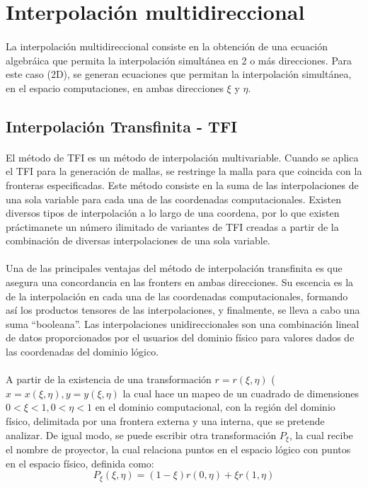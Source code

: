 \documentclass[letterpaper, openright, 12pt]{book}
\begin{document}
	\section{Interpolación multidireccional}
		\paragraph*{}
			La interpolación multidireccional consiste en la obtención de una ecuación algebráica que permita la interpolación simultánea en 2 o más direcciones. Para este caso (2D), se generan ecuaciones que permitan la interpolación simultánea, en el espacio computaciones, en ambas direcciones $\xi$ y $\eta$.
		\subsection{Interpolación Transfinita - TFI}
			\paragraph*{}
				El método de TFI es un método de interpolación multivariable. Cuando se aplica el TFI para la generación de mallas, se restringe la malla para que coincida con la fronteras especificadas. Este método consiste en la suma de las interpolaciones de una sola variable para cada una de las coordenadas computacionales. Existen diversos tipos de interpolación a lo largo de una coordena, por lo que existen práctimanete un número ilimitado de variantes de TFI creadas a partir de la combinación de diversas interpolaciones de una sola variable.\cite{thompsonhandbook}
			\paragraph*{}
				Una de las principales ventajas del método de interpolación transfinita es que asegura una concordancia en las fronters en ambas direcciones. Su escencia es la de la interpolación en cada una de las coordenadas computacionales, formando así los productos tensores de las interpolaciones, y finalmente, se lleva a cabo una suma ``booleana''. Las interpolaciones unidireccionales son una combinación lineal de datos proporcionados por el usuarios del dominio físico para valores dados de las coordenadas del dominio lógico.
			\paragraph*{}
				A partir de la existencia de una transformación $r = r(\xi, \eta)$ ($x = x(\xi, \eta), y = y(\xi, \eta)$ la cual hace un mapeo de un cuadrado de dimensiones $0 < \xi < 1, 0 < \eta < 1$ en el dominio computacional, con la región del dominio físico, delimitada por una frontera externa y una interna, que se pretende analizar. De igual modo, se puede escribir otra transformación $P_{\xi}$, la cual recibe el nombre de proyector, la cual relaciona puntos en el espacio lógico con puntos en el espacio físico, definida como:
				\begin{equation}
					P_{\xi}(\xi, \eta) = (1 - \xi)r(0, \eta) + \xi r(1, \eta)
				\end{equation}
\end{document}
